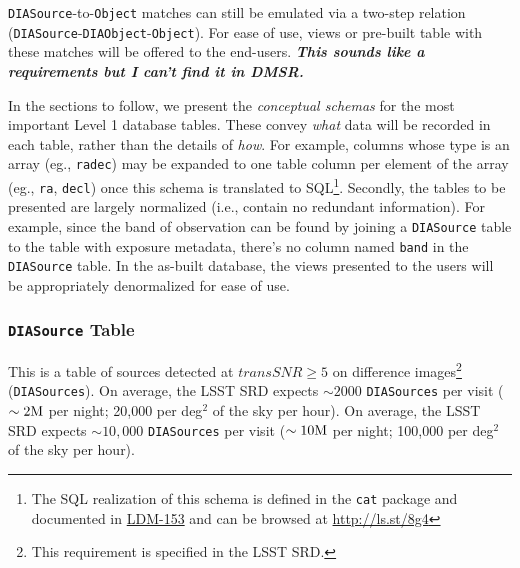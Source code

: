 \documentclass[12pt]{article}
\newcommand{\B}[1]{{\color{blue} #1}}
\newcommand{\R}[1]{{\color{red} #1}}
\newcommand{\code}[1]{\texttt{#1}}
\newcommand{\annotate}[1]{{\color{magenta}\large\textbf{\emph{#1}}}}
\newcommand{\DIASource}{\code{DIASource}\xspace}
\newcommand{\DIASources}{\code{DIASources}\xspace}
\newcommand{\DIAObject}{\code{DIAObject}\xspace}
\newcommand{\DIAObjects}{\code{DIAObjects}\xspace}
\newcommand{\DB}{{Level 1 database}\xspace}
\newcommand{\Object}{\code{Object}\xspace}
\newcommand{\SSObject}{\code{SSObject}\xspace}
\newcommand{\transSNR}{5\xspace}
\newcommand{\req}[1]{\marginpar{\tiny #1}}
\begin{document}
\vspace{1ex}
\DIASource-to-\Object matches can still be emulated via a two-step relation (\DIASource-\DIAObject-\Object). For ease of use, views or pre-built table with these matches will be offered to the end-users. \annotate{This sounds like a requirements but I can't find it in DMSR.}


\vspace{2em}

In the sections to follow, we present the {\em conceptual schemas} for the most important \DB tables. These convey {\em what} data will be recorded in each table, rather than the details of {\em how}. For example, columns whose type is an array (eg., \texttt{radec}) may be expanded to one table column per element of the array (eg., \texttt{ra}, \texttt{decl}) once this schema is translated to SQL\footnote{The SQL realization of this schema \B{is defined in the \texttt{cat} package and documented in \href{http://ls.st/LDM-153}{LDM-153}\nocite{LDM-153} and} can be browsed at \url{http://ls.st/8g4}}. Secondly, the tables to be presented are largely normalized (i.e., contain no redundant information). For example, since the band of observation can be found by joining a \DIASource table to the table with exposure metadata, there's no column named {\tt band} in the \DIASource table. In the as-built database, the views presented to the users will be appropriately denormalized for ease of use.

\subsubsection{\DIASource Table}

This is a table of sources detected at $transSNR \geq \transSNR$ \req{transSNR} on difference images\footnote{This requirement is specified in the LSST SRD.}\req{LSR-REQ-0101} (\DIASources).
\R{On average, the LSST SRD expects $\sim 2000$ \DIASources per visit ($\sim 2{\rm M}$ per night; 20,000 per deg$^2$ of the sky per hour).}
\B{
On average, the LSST SRD expects $\sim 10,000$ \DIASources per visit ($\sim 10{\rm M}$ per night; 100,000 per deg$^2$ of the sky per hour).
}
\req{transN}
\end{document}
